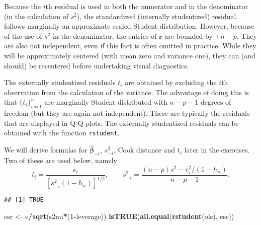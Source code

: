 \documentclass[]{book}
\newenvironment{Shaded}{\begin{snugshade}}{\end{snugshade}}
\newcommand{\CommentTok}[1]{\textcolor[rgb]{0.56,0.35,0.01}{\textit{#1}}}
\newcommand{\DecValTok}[1]{\textcolor[rgb]{0.00,0.00,0.81}{#1}}
\newcommand{\KeywordTok}[1]{\textcolor[rgb]{0.13,0.29,0.53}{\textbf{#1}}}
\newcommand{\NormalTok}[1]{#1}
\newcommand{\OperatorTok}[1]{\textcolor[rgb]{0.81,0.36,0.00}{\textbf{#1}}}
\newcommand{\StringTok}[1]{\textcolor[rgb]{0.31,0.60,0.02}{#1}}
\theoremstyle{definition}
\theoremstyle{definition}
\theoremstyle{definition}
\theoremstyle{remark}
\begin{document}
Because the \(i\)th residual is used in both the numerator and in the
denominator (in the calculation of \(s^2\)), the standardized
(internally studentized) residual follows marginally an approximate
scaled Student distribution. However, because of the use of \(s^2\) in
the denominator, the entries of \(\boldsymbol{r}\) are bounded by
\(\pm n-p\). They are also not independent, even if this fact is often
omitted in practice. While they will be approximately centered (with
mean zero and variance one), they can (and should) be recentered before
undertaking visual diagnostics.

The externally studentized residuals \(t_i\) are obtained by excluding
the \(i\)th observation from the calculation of the variance. The
advantage of doing this is that \(\{t_i\}_{i=1}^n\) are marginally
Student distributed with \(n-p-1\) degrees of freedom (but they are
again not independent). These are typically the residuals that are
displayed in Q-Q plots. The externally studentized residuals can be
obtained with the function \texttt{rstudent}.

We will derive formulas for \(\hat{\boldsymbol{\beta}}_{-i}\),
\(s^2_{-i}\), Cook distance and \(t_i\) later in the exercises. Two of
these are used below, namely
\[t_i =  \frac{e_i}{[s^2_{-i}(1-h_{ii})]^{1/2}}, \qquad s^2_{-i} = \frac{(n-p)s^2 -e_i^2/(1-h_{ii})}{n-p-1}. \]

\begin{Shaded}
\end{Shaded}

\begin{verbatim}
## [1] TRUE
\end{verbatim}

\begin{Shaded}
\begin{Highlighting}[]
\NormalTok{esr <-}\StringTok{ }\NormalTok{e}\OperatorTok{/}\KeywordTok{sqrt}\NormalTok{(s2mi}\OperatorTok{*}\NormalTok{(}\DecValTok{1}\OperatorTok{-}\NormalTok{leverage))}
\KeywordTok{isTRUE}\NormalTok{(}\KeywordTok{all.equal}\NormalTok{(}\KeywordTok{rstudent}\NormalTok{(ols), esr))}
\end{Highlighting}
\end{Shaded}
\end{document}
